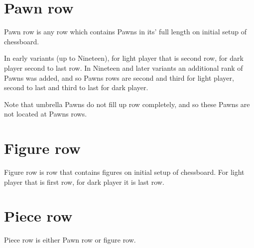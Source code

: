\section*{Pawn row}
\label{sec:Terms/Pawn row}
Pawn row is any row which contains Pawns in its' full length on initial setup
of chessboard.

In early variants (up to Nineteen), for light player that is second row, for
dark player second to last row. In Nineteen and later variants an additional
rank of Pawns was added, and so Pawns rows are second and third for light
player, second to last and third to last for dark player.

Note that umbrella Pawns do not fill up row completely, and so these Pawns are
not located at Pawns rows.

\section*{Figure row}
\label{sec:Terms/Figure row}
Figure row is row that contains figures on initial setup of chessboard.
For light player that is first row, for dark player it is last row.

\section*{Piece row}
\label{sec:Terms/Piece row}
Piece row is either Pawn row or figure row.

\clearpage %
